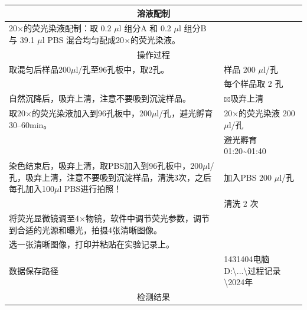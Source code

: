 \documentclass[UTF8,10pt,a4paper,fontset=fandol]{ctexart}
\newcommand{\fieldvalue}[1]{#1}
\newcommand{\handwritten}[1]{#1}
\begin{document}
\begin{center}
\small
\begin{tabularx}{\textwidth}{|p{}|X|}
\hline
\multicolumn{2}{|c|}{溶液配制}\\
\hline
20$\times$的荧光染液配制：取
\fieldvalue{\handwritten{0.2}} $\mu$l 组分A 和
\fieldvalue{\handwritten{0.2}} $\mu$l 组分B 与
\fieldvalue{\handwritten{39.1}} $\mu$l PBS 混合均匀配成20$\times$的荧光染液。&
\\
\hline
\multicolumn{2}{|c|}{操作过程}\\
\hline
取混匀后样品200$\mu$l/孔至96孔板中，取2孔。&
样品
\fieldvalue{\handwritten{200}} $\mu$l/孔\\
&
每个样品取
\fieldvalue{\handwritten{2}} 孔\\
\hline
自然沉降后，吸弃上清，注意不要吸到沉淀样品。&
\fieldvalue{\(\boxtimes\)吸弃上清}\\
\hline
取20$\times$的荧光染液加入到96孔板中，200$\mu$l/孔，避光孵育30--60min。&
20$\times$的荧光染液
\fieldvalue{\handwritten{200}} $\mu$l/孔\\
&
避光孵育
\fieldvalue{\handwritten{01:20\textasciitilde01:40}}\\
\hline
染色结束后，吸弃上清，取PBS加入到96孔板中，200$\mu$l/孔，吸弃上清，注意不要吸到沉淀样品，清洗3次，之后每孔加入100$\mu$l PBS进行拍照！&
加入PBS
\fieldvalue{\handwritten{200}} $\mu$l/孔\\
&
清洗
\fieldvalue{\handwritten{2}} 次\\
\hline
将荧光显微镜调至4$\times$物镜，软件中调节荧光参数，调节到合适的光源和曝光，拍摄4张清晰图像。&
\\
\hline
选一张清晰图像，打印并粘贴在实验记录上。&
\\
\hline
数据保存路径&
\fieldvalue{\handwritten{1431404电脑D:\textbackslash ...\textbackslash 过程记录\textbackslash 2024年}}\\
\hline
\multicolumn{2}{|c|}{检测结果}\\
\hline
\end{tabularx}
\end{center}
\end{document}
